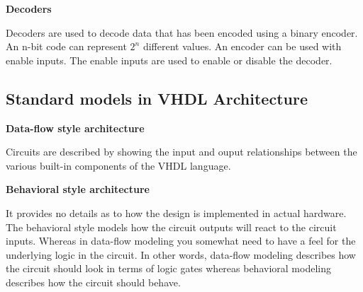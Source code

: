 \textbf{Decoders}

Decoders are used to decode data that has been encoded using a binary encoder.
An n-bit code can represent $2^n$ different values.
An encoder can be used with enable inputs. The enable inputs are used to enable or disable the decoder.

\newpage
\subsection{Standard models in VHDL Architecture}


\textbf{Data-flow style architecture}

Circuits are described by showing the input and ouput relationships between the various built-in components of the VHDL language.

\textbf{Behavioral style architecture}

It provides no details as to how the design is implemented in actual hardware.
The behavioral style models how the circuit outputs will react to the circuit inputs.
Whereas in data-flow modeling you somewhat need to have a feel for the underlying logic in the circuit.
In other words, data-flow modeling describes how the circuit should look in terms of logic gates
whereas behavioral modeling describes how the circuit should behave.

